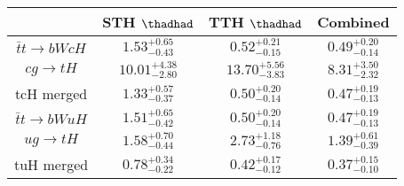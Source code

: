 \centering
\begin{tabular}{|c|c|c|c|} \hline
 & STH $\thadhad$ & TTH $\thadhad$ & Combined\\\hline
$\bar{t}t\to bWcH$ & $1.53^{+0.65}_{-0.43}$ & $0.52^{+0.21}_{-0.15}$ & $0.49^{+0.20}_{-0.14}$\\\hline
$cg\to tH$ & $10.01^{+4.38}_{-2.80}$ & $13.70^{+5.56}_{-3.83}$ & $8.31^{+3.50}_{-2.32}$\\\hline
tcH merged & $1.33^{+0.57}_{-0.37}$ & $0.50^{+0.20}_{-0.14}$ & $0.47^{+0.19}_{-0.13}$\\\hline
$\bar{t}t\to bWuH$ & $1.51^{+0.65}_{-0.42}$ & $0.50^{+0.20}_{-0.14}$ & $0.47^{+0.19}_{-0.13}$\\\hline
$ug\to tH$ & $1.58^{+0.70}_{-0.44}$ & $2.73^{+1.18}_{-0.76}$ & $1.39^{+0.61}_{-0.39}$\\\hline
tuH merged & $0.78^{+0.34}_{-0.22}$ & $0.42^{+0.17}_{-0.12}$ & $0.37^{+0.15}_{-0.10}$\\\hline
\end{tabular}
